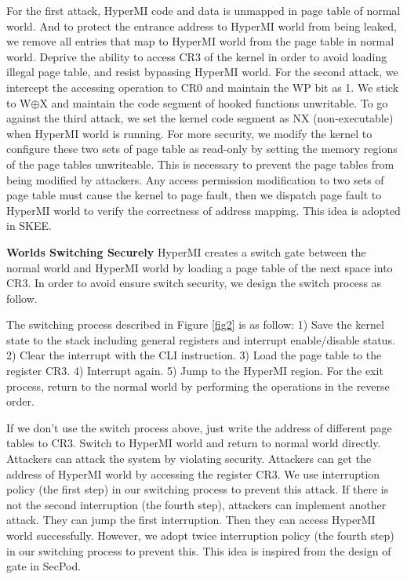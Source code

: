 \documentclass[conference]{IEEEtran}
\begin{document}
For the first attack, HyperMI code and data is unmapped in page table of normal world. And to protect the entrance address to HyperMI world from being leaked,
we remove all entries that map to HyperMI world from the page table in normal world. Deprive the ability to access CR3 of the kernel in order to avoid loading illegal page table, and resist bypassing HyperMI world.
For the second attack, we intercept the accessing operation to CR0 and maintain the WP bit as 1. We stick to W$\oplus${X} and maintain the code segment of hooked functions unwritable.
To go against the third attack, we set the kernel code segment as NX (non-executable) when HyperMI world is running. For more security, we modify the kernel to configure these two sets of page table as read-only by setting the memory regions of the page tables unwriteable. This is necessary to prevent the page tables from being modified by attackers. Any access permission modification to two sets of page table must cause the kernel to page fault, then we dispatch page fault to HyperMI world to verify the correctness of address mapping. 
This idea is adopted in SKEE\cite{Azab2016SKEE}.


\textbf{Worlds Switching Securely}
HyperMI creates a switch gate between the normal world and HyperMI world by loading a page table of the next space into CR3.
In order to avoid ensure switch security, we design the switch process as follow.

The switching process described in Figure \ref{fig2} is as follow: 1) Save the kernel state to the stack including general registers and interrupt enable/disable status. 2) Clear the interrupt with the CLI instruction. 3) Load the page table to the register CR3. 4) Interrupt again. 5) Jump to the HyperMI region. For the exit process, return to the normal world by performing the operations in the reverse order.

\iffalse
If we don't use the switch process above, just write the address of different page tables to CR3. Switch to HyperMI world and return to normal world directly. Attackers can attack the system by violating security. Attackers can get the address of HyperMI world by accessing the register CR3. We use interruption policy (the first step) in our switching process to prevent this attack. 
If there is not the second interruption (the fourth step), attackers can implement another attack. They can jump the first interruption.
Then they can access HyperMI world successfully. 
However, we adopt twice interruption policy (the fourth step) in our switching process to prevent this. 
This idea is inspired from the design of gate in SecPod\cite{Wang2015SecPod}.
\end{document}
